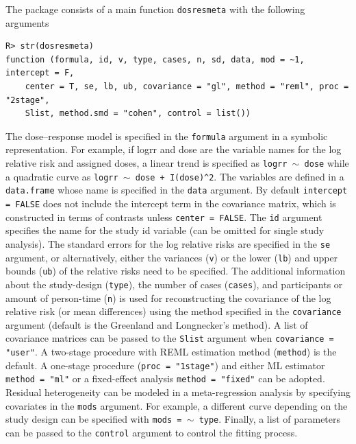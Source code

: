\documentclass[11pt,a4paper,twoside,openany]{book}\usepackage{knitr}
\begin{document}
{{\noindent The package consists of a main function \texttt{dosresmeta} with the following arguments
\begin{knitrout}\footnotesize
{}\color{fgcolor}\begin{kframe}
\begin{verbatim}
R> str(dosresmeta)
function (formula, id, v, type, cases, n, sd, data, mod = ~1, intercept = F, 
    center = T, se, lb, ub, covariance = "gl", method = "reml", proc = "2stage", 
    Slist, method.smd = "cohen", control = list())  
\end{verbatim}
\end{kframe}
\end{knitrout}

\noindent The dose--response model is specified in the \texttt{formula} argument in a symbolic representation. For example, if logrr and dose are the variable names for the log relative risk and assigned doses, a linear trend is specified as \texttt{logrr $\sim$ dose} while a quadratic curve as \texttt{logrr $\sim$ dose + I(dose)\^{}2}. The variables are defined in a \texttt{data.frame} whose name is specified in the \texttt{data} argument. By default \texttt{intercept = FALSE} does not include the intercept term in the covariance matrix, which is constructed in terms of contrasts unless \texttt{center = FALSE}. The \texttt{id} argument specifies the name for the study id variable (can be omitted for single study analysis). 
The standard errors for the log relative risks are specified in the \texttt{se} argument, or alternatively, either the variances (\texttt{v}) or the lower (\texttt{lb}) and upper bounds (\texttt{ub}) of the relative risks need to be specified. The additional information about the study-design (\texttt{type}), the number of cases (\texttt{cases}), and participants or amount of person-time (\texttt{n}) is used for reconstructing the covariance of the log relative risk (or mean differences) using the method specified in the \texttt{covariance} argument (default is the Greenland and Longnecker’s method). A list of covariance matrices can be passed to the \texttt{Slist} argument when \texttt{covariance = "user"}.
A two-stage procedure with REML estimation method (\texttt{method}) is the default. A one-stage procedure (\texttt{proc = "1stage"}) and either ML estimator \texttt{method = "ml"} or a fixed-effect analysis \texttt{method = "fixed"} can be adopted. Residual heterogeneity can be modeled in a meta-regression analysis by specifying covariates in the \texttt{mods} argument. For example, a different curve depending on the study design can be specified with \texttt{mods = $\sim$ type}. Finally, a list of parameters can be passed to the \texttt{control} argument to control the fitting process.

}}
\end{document}
